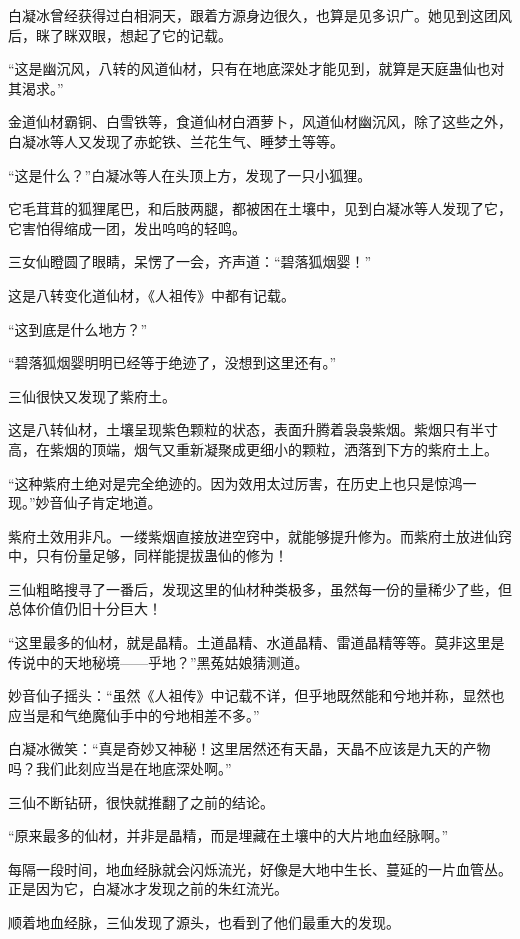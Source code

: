 \begin{this_body}
白凝冰曾经获得过白相洞天，跟着方源身边很久，也算是见多识广。她见到这团风后，眯了眯双眼，想起了它的记载。

“这是幽沉风，八转的风道仙材，只有在地底深处才能见到，就算是天庭蛊仙也对其渴求。”

金道仙材霸铜、白雪铁等，食道仙材白酒萝卜，风道仙材幽沉风，除了这些之外，白凝冰等人又发现了赤蛇铁、兰花生气、睡梦土等等。

“这是什么？”白凝冰等人在头顶上方，发现了一只小狐狸。

它毛茸茸的狐狸尾巴，和后肢两腿，都被困在土壤中，见到白凝冰等人发现了它，它害怕得缩成一团，发出呜呜的轻鸣。

三女仙瞪圆了眼睛，呆愣了一会，齐声道：“碧落狐烟婴！”

这是八转变化道仙材，《人祖传》中都有记载。

“这到底是什么地方？”

“碧落狐烟婴明明已经等于绝迹了，没想到这里还有。”

三仙很快又发现了紫府土。

这是八转仙材，土壤呈现紫色颗粒的状态，表面升腾着袅袅紫烟。紫烟只有半寸高，在紫烟的顶端，烟气又重新凝聚成更细小的颗粒，洒落到下方的紫府土上。

“这种紫府土绝对是完全绝迹的。因为效用太过厉害，在历史上也只是惊鸿一现。”妙音仙子肯定地道。

紫府土效用非凡。一缕紫烟直接放进空窍中，就能够提升修为。而紫府土放进仙窍中，只有份量足够，同样能提拔蛊仙的修为！

三仙粗略搜寻了一番后，发现这里的仙材种类极多，虽然每一份的量稀少了些，但总体价值仍旧十分巨大！

“这里最多的仙材，就是晶精。土道晶精、水道晶精、雷道晶精等等。莫非这里是传说中的天地秘境——乎地？”黑菟姑娘猜测道。

妙音仙子摇头：“虽然《人祖传》中记载不详，但乎地既然能和兮地并称，显然也应当是和气绝魔仙手中的兮地相差不多。”

白凝冰微笑：“真是奇妙又神秘！这里居然还有天晶，天晶不应该是九天的产物吗？我们此刻应当是在地底深处啊。”

三仙不断钻研，很快就推翻了之前的结论。

“原来最多的仙材，并非是晶精，而是埋藏在土壤中的大片地血经脉啊。”

每隔一段时间，地血经脉就会闪烁流光，好像是大地中生长、蔓延的一片血管丛。正是因为它，白凝冰才发现之前的朱红流光。

顺着地血经脉，三仙发现了源头，也看到了他们最重大的发现。


\end{this_body}
